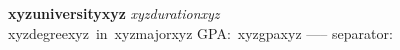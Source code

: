 \textbf{xyzuniversityxyz} \hfill \textit{\small xyzdurationxyz}\\
\small xyzdegreexyz\ in\ xyzmajorxyz \hfill GPA:\ xyzgpaxyz
-----
separator: \vspace{4pt}
